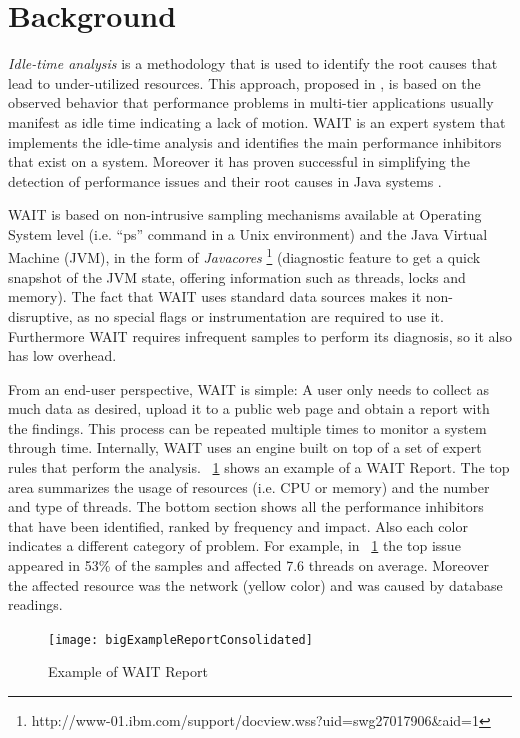 \documentclass[runningheads,a4paper]{llncs}
\begin{document}
\section{Background}
\label{Background}
\vspace{-7pt}
\emph{Idle-time analysis} is a methodology that is used to identify the root
causes that lead to under-utilized resources. This approach, proposed in
\cite{Altman2010}, is based on the observed behavior that performance problems in multi-tier
applications usually manifest as idle time indicating a lack of motion.
WAIT is an expert system that implements the idle-time analysis and identifies
the main performance inhibitors that exist on a system. Moreover it has proven successful in simplifying the detection of performance issues and their root causes in Java
systems \cite{Altman2010,Wu1}.

WAIT is based on non-intrusive sampling mechanisms available at
Operating System level (i.e. ``ps'' command in a Unix environment) and the Java
Virtual Machine (JVM), in the form of \emph{Javacores}
\footnote{http://www-01.ibm.com/support/docview.wss?uid=swg27017906\&aid=1}
(diagnostic feature to get a quick snapshot of the JVM state, offering
information such as threads, locks and memory). The fact that WAIT uses standard
data sources makes it non-disruptive, as no special flags or instrumentation are
required to use it. Furthermore WAIT requires infrequent samples to perform its
diagnosis, so it also has low overhead.

From an end-user perspective, WAIT is simple: A user only needs to
collect as much data as desired, upload it to a public web page and obtain a
report with the findings. This process can be repeated multiple times to monitor a
system through time. Internally, WAIT uses an engine built on top of a set of 
expert rules that perform the analysis. \figurename ~\ref{fig_WAITReport} shows an
example of a WAIT Report. The top area summarizes the usage of resources (i.e.
CPU or memory) and the number and type of threads. The bottom section shows all
the performance inhibitors that have been identified, ranked by frequency and impact. 
Also each color indicates a different category of problem. For example, in
\figurename ~\ref{fig_WAITReport} the top issue appeared in 53\% of the samples
and affected 7.6 threads on average. Moreover the affected resource was the
network (yellow color) and was caused by database readings.

\begin{figure}[!h]
\centering
\texttt{[image: bigExampleReportConsolidated]}
\caption{Example of WAIT Report}
\label{fig_WAITReport}
\end{figure}
\end{document}
